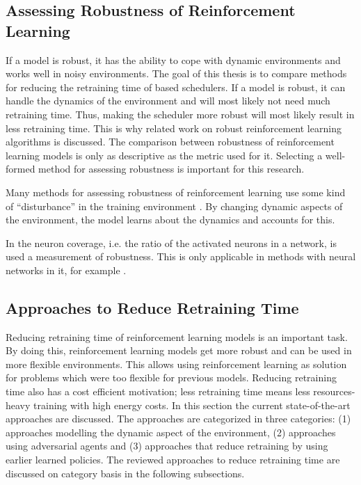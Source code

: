 \subsection{Assessing Robustness of Reinforcement Learning}

If a \rl model is robust, it has the ability to cope with dynamic environments
and works well in noisy environments. The goal of this thesis is to compare
methods for reducing the retraining time of \rl based schedulers. If a model
is robust, it can handle the dynamics of the environment and will most likely
not need much retraining time. Thus, making the \rl scheduler more robust will
most likely result in less retraining time. This is why related work on robust
reinforcement learning algorithms is discussed. The comparison between
robustness of reinforcement learning models is only as descriptive as the
metric used for it. Selecting a well-formed method for assessing
robustness is important for this research.

Many methods for assessing robustness of reinforcement learning use some kind
of ``disturbance'' in the training environment \cite{morimoto2005}. By
changing dynamic aspects of the environment, the model learns about the
dynamics and accounts for this.


In  the neuron coverage, i.e. the ratio of the activated
neurons in a network, is used a measurement of robustness. This is only
applicable in \rl methods with neural networks in it, for example \dqn.




\subsection{Approaches to Reduce Retraining Time}\label{sec:reduce}

Reducing retraining time of reinforcement learning models is an important
task. By doing this, reinforcement learning models get more robust
and can be used in more flexible environments. This allows using reinforcement
learning as solution for problems which were too flexible for previous
\rl models. Reducing retraining time also has a cost efficient motivation;
less retraining time means less resources-heavy training with high energy
costs. In this section the current state-of-the-art approaches are discussed.
The approaches are categorized in three categories: (1) approaches modelling
the dynamic aspect of the environment, (2) approaches using adversarial agents
and (3) approaches that reduce retraining by using earlier learned policies.
The reviewed approaches to reduce retraining time are discussed on category
basis in the following subsections.


